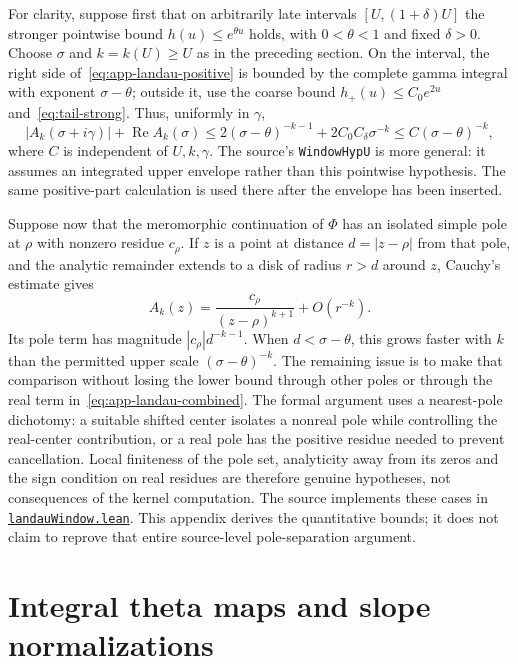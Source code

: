 \documentclass[11pt,openany,oneside]{scrbook}
\theoremstyle{definition}
\theoremstyle{remark}
\newcommand{\Rea}{\operatorname{Re}}
\newcommand{\baseurl}{https://github.com/CocoSgt/riemann-hypothesis-lean/blob/7cbf7a0c32fca1badf05931879a37c3f8a2b03b4/}
\newcommand{\sourcefile}[2]{\href{\baseurl#1}{\texttt{#2}}}
\begin{document}
For clarity, suppose first that on arbitrarily late intervals $[U,(1+\delta)U]$ the stronger pointwise bound $h(u)\le e^{\theta u}$ holds, with $0<\theta<1$ and fixed $\delta>0$. Choose $\sigma$ and $k=k(U)\ge U$ as in the preceding section. On the interval, the right side of~\eqref{eq:app-landau-positive} is bounded by the complete gamma integral with exponent $\sigma-\theta$; outside it, use the coarse bound $h_+(u)\le C_0e^{2u}$ and~\eqref{eq:tail-strong}. Thus, uniformly in $\gamma$,
\begin{equation}\label{eq:app-landau-combined}
 |A_k(\sigma+i\gamma)|+\Rea A_k(\sigma)
 \le 2(\sigma-\theta)^{-k-1}+2C_0C_\delta\sigma^{-k}
 \le C(\sigma-\theta)^{-k},
\end{equation}
where $C$ is independent of $U,k,\gamma$. The source's \texttt{WindowHypU} is more general: it assumes an integrated upper envelope rather than this pointwise hypothesis. The same positive-part calculation is used there after the envelope has been inserted.

Suppose now that the meromorphic continuation of $\Phi$ has an isolated simple pole at $\rho$ with nonzero residue $c_\rho$. If $z$ is a point at distance $d=|z-\rho|$ from that pole, and the analytic remainder extends to a disk of radius $r>d$ around $z$, Cauchy's estimate gives
\begin{equation}\label{eq:app-pole-asym}
 A_k(z)=\frac{c_\rho}{(z-\rho)^{k+1}}+O(r^{-k}).
\end{equation}
Its pole term has magnitude $|c_\rho|d^{-k-1}$. When $d<\sigma-\theta$, this grows faster with $k$ than the permitted upper scale $(\sigma-\theta)^{-k}$. The remaining issue is to make that comparison without losing the lower bound through other poles or through the real term in~\eqref{eq:app-landau-combined}. The formal argument uses a nearest-pole dichotomy: a suitable shifted center isolates a nonreal pole while controlling the real-center contribution, or a real pole has the positive residue needed to prevent cancellation. Local finiteness of the pole set, analyticity away from its zeros and the sign condition on real residues are therefore genuine hypotheses, not consequences of the kernel computation. The source implements these cases in \sourcefile{src/Development/AutomorphicArithmetic/DedekindLFunctions/LandauTheorems/landauWindow.lean}{landauWindow.lean}. This appendix derives the quantitative bounds; it does not claim to reprove that entire source-level pole-separation argument.

\chapter{Integral theta maps and slope normalizations}\label{app:geometry}
\end{document}
